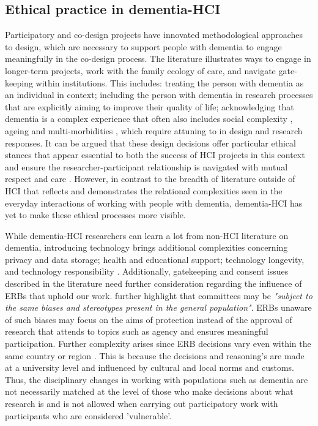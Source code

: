 \subsection{Ethical practice in dementia-HCI}
\label{BL:gap:Ethics}
Participatory and co-design projects have innovated methodological approaches to design, which are necessary to support people with dementia to engage meaningfully in the co-design process. The literature illustrates ways to engage in longer-term projects, work with the family ecology of care, and navigate gate-keeping within institutions. This includes: treating the person with dementia as an individual in context; including the person with dementia in research processes that are explicitly aiming to improve their quality of life; acknowledging that dementia is a complex experience that often also includes social complexity \citep{keyes2019living}, ageing and multi-morbidities \citep{buse_materialising_2016}, which require attuning to in design and research responses. It can be argued that these design decisions offer particular ethical stances that appear essential to both the success of HCI projects in this context and ensure the researcher-participant relationship is navigated with mutual respect and care \citep{foley_care_2019}. However, in contrast to the breadth of literature outside of HCI that reflects and demonstrates the relational complexities seen in the everyday interactions of working with people with dementia, dementia-HCI has yet to make these ethical processes more visible.

While dementia-HCI researchers can learn a lot from non-HCI literature on dementia, introducing technology brings additional complexities concerning privacy and data storage; health and educational support; technology longevity, and technology responsibility \citep{cornejo_vulnerability_2016}. Additionally, gatekeeping and consent issues described in the literature need further consideration regarding the influence of ERBs that uphold our work. \cite{pachana_can_2014} further highlight that committees may be \textit{"subject to the same biases and stereotypes present in the general population"}. ERBs unaware of such biases may focus on the aims of protection instead of the approval of research that attends to topics such as agency and ensures meaningful participation. Further complexity arises since ERB decisions vary even within the same country or region \citep{edwards_research_2004}. This is because the decisions and reasoning's are made at a university level and influenced by cultural and local norms and customs. Thus, the disciplinary changes in working with populations such as dementia are not necessarily matched at the level of those who make decisions about what research is and is not allowed when carrying out participatory work with participants who are considered 'vulnerable'.

